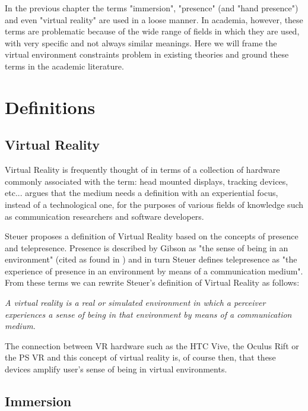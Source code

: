 In the previous chapter the terms "immersion", "presence" (and "hand presence") and even "virtual reality" are used in a loose manner. In academia, however, these terms are problematic because of the wide range of fields in which they are used, with very specific and not always similar meanings. Here we will frame the virtual environment constraints problem in existing theories and ground these terms in the academic literature.

\section{Definitions}
\label{sec:definitions}

\subsection{Virtual Reality}
\label{subsec:vrDef}

Virtual Reality is frequently thought of in terms of a collection of hardware commonly associated with the term: head mounted displays, tracking devices, etc... \parencite{Steuer1992} argues that the medium needs a definition with an experiential focus, instead of a technological one, for the purposes of various fields of knowledge such as communication researchers and software developers.

Steuer proposes a definition of Virtual Reality based on the concepts of presence and telepresence. Presence is described by Gibson as "the sense of being in an environment" (cited as found in \parencite{Steuer1992}) and in turn Steuer defines telepresence as "the experience of presence in an environment by means of a communication medium". From these terms we can rewrite Steuer's definition of Virtual Reality as follows:

\begin{displayquote}
\textit{A virtual reality is a real or simulated environment in which a perceiver experiences a sense of being in that environment by means of a communication medium.}
\end{displayquote}

The connection between VR hardware such as the HTC Vive, the Oculus Rift or the PS VR and this concept of virtual reality is, of course then, that these devices amplify user's sense of being in virtual environments.

\subsection{Immersion}
\label{subsec:immersion}

